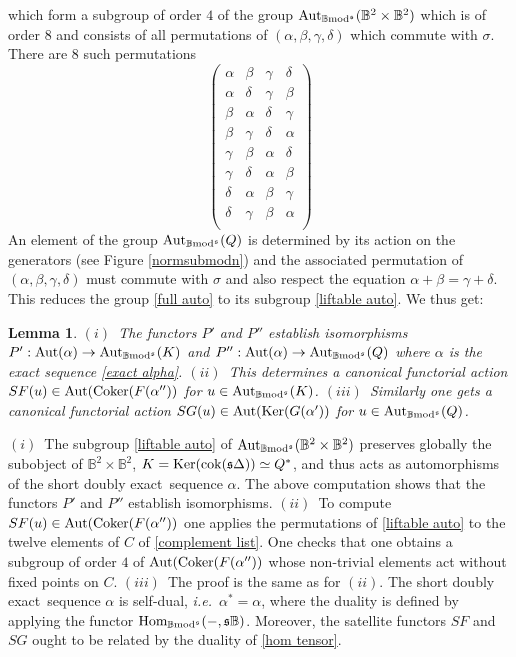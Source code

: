 \documentclass[12pt]{article}
\newtheorem{lem}[thm]{Lemma}
\def\Aut{{\rm Aut}}
\def\Hom{{\rm Hom}}
\def\coker{{\rm Coker}}
\def\scoker{{\rm cok}}
\def\B{{\mathbb B}}
\def\exxx{{doubly exact}~}
\newcommand{\ie}{{\it i.e.\/}\ }
\def\ker{{\mbox{Ker}}}
\def\Hom {{\mbox{Hom}}}
\def\yb{\mathfrak{s}}
\def\b2{{\rm \B mod^{\mathfrak s}}}
\begin{document}
which form a subgroup of order $4$ of the group $\Aut_\b2(\B^2\times \B^2)$ which is of order $8$ and  consists of all permutations of $(\alpha,\beta,\gamma,\delta)$ which commute with $\sigma$. There are $8$ such permutations 
\begin{equation}\label{full auto}
\left(
\begin{array}{cccc}
 \alpha  & \beta  & \gamma  & \delta  \\
 \alpha  & \delta  & \gamma  & \beta  \\
 \beta  & \alpha  & \delta  & \gamma  \\
 \beta  & \gamma  & \delta  & \alpha  \\
 \gamma  & \beta  & \alpha  & \delta  \\
 \gamma  & \delta  & \alpha  & \beta  \\
 \delta  & \alpha  & \beta  & \gamma  \\
 \delta  & \gamma  & \beta  & \alpha  \\
\end{array}
\right)
 \end{equation}
An element of the group $\Aut_\b2(Q)$ is determined by its action on the generators (see Figure \ref{normsubmodn}) and the associated permutation of $(\alpha,\beta,\gamma,\delta)$ must commute with $\sigma$ and also respect the equation $\alpha+\beta=\gamma+\delta$. This reduces the group \eqref{full auto} to its subgroup \eqref{liftable auto}.
We thus get:
\begin{lem}\label{covariance} $(i)$~The functors $P'$ and $P''$ establish  isomorphisms $P':\Aut(\alpha)\to \Aut_\b2(K)$ and $P'':\Aut(\alpha)\to \Aut_\b2(Q)$ where $\alpha$ is the exact sequence \eqref{exact alpha}.\newline
$(ii)$~This determines a canonical functorial action $SF(u)\in \Aut(\coker(F(\alpha''))$ for $u\in \Aut_\b2(K)$.\newline
$(iii)$~Similarly one gets a canonical functorial action $SG(u)\in \Aut(\ker(G(\alpha'))$ for $u\in \Aut_\b2(Q)$.\newline
\end{lem}
\proof $(i)$~The subgroup \eqref{liftable auto} of $\Aut_\b2(\B^2\times \B^2)$ preserves globally the subobject of $\B^2\times \B^2$, $K=\ker(\scoker(\yb\Delta))\simeq Q^*$, and thus acts as automorphisms of the short \exxx sequence $\alpha$. The above computation shows that the functors $P'$ and $P''$ establish  isomorphisms. \newline
$(ii)$~To compute $SF(u)\in \Aut(\coker(F(\alpha''))$ one applies the permutations of  \eqref{liftable auto} to the twelve elements of $C$ of \eqref{complement list}. One checks that one obtains a subgroup of order $4$ of $\Aut(\coker(F(\alpha''))$ whose non-trivial elements act without fixed points on $C$. \newline
$(iii)$~The proof is the same as for $(ii)$.\endproof
The short \exxx sequence $\alpha$ is self-dual, \ie $\alpha^*=\alpha$, where the duality is defined by applying the functor $\Hom_\b2(-,\yb\B)$. Moreover, the satellite functors $SF$ and $SG$ ought to be related by  the duality of \eqref{hom tensor}. \vspace{.05in}
\end{document}
